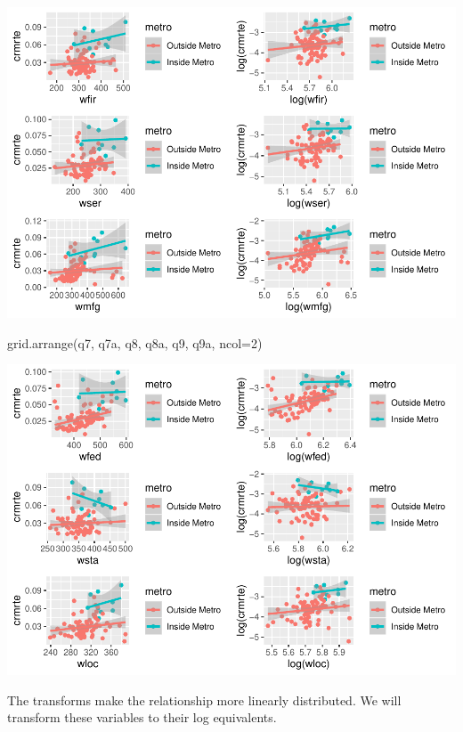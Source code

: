\documentclass[]{article}
\newenvironment{Shaded}{}{}
\newcommand{\DataTypeTok}[1]{#1}
\newcommand{\DecValTok}[1]{#1}
\newcommand{\KeywordTok}[1]{\textcolor[rgb]{0.00,0.00,1.00}{#1}}
\newcommand{\NormalTok}[1]{#1}
\begin{document}
\includegraphics{Bagnard_Gaustad_Hartman_Leung_Lab_3_files/figure-latex/unnamed-chunk-92-2.pdf}

\begin{Shaded}
\begin{Highlighting}[]
\KeywordTok{grid.arrange}\NormalTok{(q7, q7a, q8, q8a, q9, q9a, }\DataTypeTok{ncol=}\DecValTok{2}\NormalTok{)}
\end{Highlighting}
\end{Shaded}

\includegraphics{Bagnard_Gaustad_Hartman_Leung_Lab_3_files/figure-latex/unnamed-chunk-92-3.pdf}

The transforms make the relationship more linearly distributed. We will
transform these variables to their log equivalents.
\end{document}
